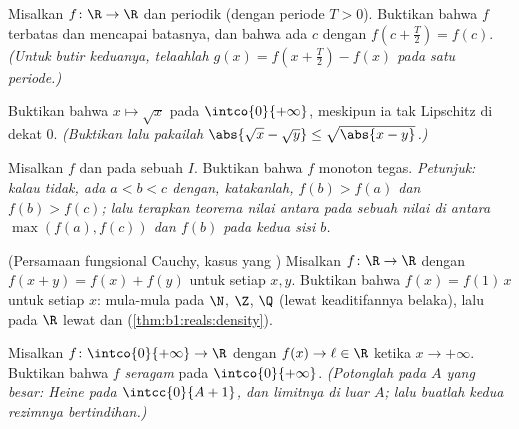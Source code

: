 \begin{exercise}[$\star\star$]\label{exo:b1:continuity:8}
Misalkan $f \colon \R \to \R$  dan periodik (dengan periode $T >
0$). Buktikan bahwa $f$ terbatas dan mencapai batasnya, dan bahwa
ada $c$ dengan $f(c + \frac T2) = f(c)$. \emph{(Untuk butir
keduanya, telaahlah $g(x) = f(x + \frac T2) - f(x)$ pada satu periode.)}
\end{exercise}

\begin{exercise}[$\star\star$]\label{exo:b1:continuity:9}
Buktikan bahwa $x \mapsto \sqrt x$  pada
$\intco{0}{+\infty}$, meskipun ia tak Lipschitz di dekat $0$.
\emph{(Buktikan lalu pakailah $\abs{\sqrt x - \sqrt y} \leq \sqrt{\abs{x -
y}}$.)}
\end{exercise}

\begin{exercise}[$\star\star\star$]\label{exo:b1:continuity:10}
Misalkan $f$  dan  pada sebuah  $I$. Buktikan bahwa
$f$ monoton tegas. \emph{Petunjuk: kalau tidak, ada $a < b < c$
dengan, katakanlah, $f(b) > f(a)$ dan $f(b) > f(c)$; lalu terapkan teorema
nilai antara pada sebuah nilai di antara $\max(f(a), f(c))$ dan $f(b)$ pada
kedua sisi $b$.}
\end{exercise}

\begin{exercise}[$\star\star\star$]\label{exo:b1:continuity:11}
(Persamaan fungsional Cauchy, kasus yang ) Misalkan $f \colon \R \to
\R$  dengan $f(x + y) = f(x) + f(y)$ untuk setiap $x, y$.
Buktikan bahwa $f(x) = f(1)\,x$ untuk setiap $x$: mula-mula pada $\N$, $\Z$, $\Q$
(lewat keaditifannya belaka), lalu pada $\R$ lewat  dan 
(\cref{thm:b1:reals:density}).
\end{exercise}

\begin{exercise}[$\star\star\star$]\label{exo:b1:continuity:12}
Misalkan $f \colon \intco{0}{+\infty} \to \R$  dengan
$f(x) \to \ell \in \R$ ketika $x \to +\infty$. Buktikan bahwa $f$
 \emph{seragam} pada $\intco{0}{+\infty}$. \emph{(Potonglah pada $A$
yang besar: Heine pada $\intcc{0}{A+1}$, dan limitnya di luar $A$; lalu buatlah
kedua rezimnya bertindihan.)}
\end{exercise}

